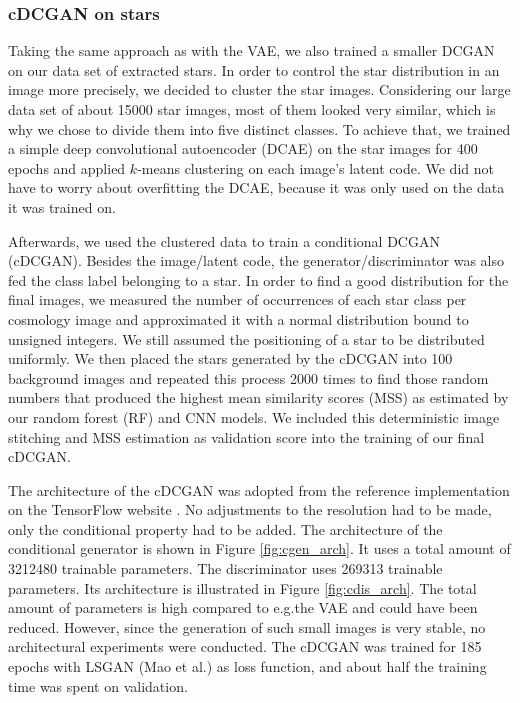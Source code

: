 \documentclass[10pt,conference,compsocconf]{IEEEtran}
\begin{document}
\subsubsection{cDCGAN on stars}
Taking the same approach as with the VAE, we also trained a smaller DCGAN on our data set of extracted stars.
In order to control the star distribution in an image more precisely, we decided to cluster the star images. Considering our large data set of about \SI{15000}{} star images, most of them looked very similar, which is why we chose to divide them into five distinct classes. To achieve that, we trained a simple deep convolutional autoencoder (DCAE) on the star images for 400 epochs and applied $k$-means clustering on each image's latent code. We did not have to worry about overfitting the DCAE, because it was only used on the data it was trained on.

Afterwards, we used the clustered data to train a conditional DCGAN (cDCGAN). Besides the image/latent code, the generator/discriminator was also fed the class label belonging to a star. In order to find a good distribution for the final images, we measured the number of occurrences of each star class per cosmology image and approximated it with a normal distribution bound to unsigned integers. We still assumed the positioning of a star to be distributed uniformly. We then placed the stars generated by the cDCGAN into \SI{100}{} background images and repeated this process \SI{2000}{} times to find those random numbers that produced the highest mean similarity scores (MSS) as estimated by our random forest (RF) and CNN models. We included this deterministic image stitching and MSS estimation as validation score into the training of our final cDCGAN.

The architecture of the cDCGAN was adopted from the reference implementation on the TensorFlow website \cite{dcgantf}. No adjustments to the resolution had to be made, only the conditional property had to be added. The architecture of the conditional generator is shown in Figure \ref{fig:cgen_arch}. It uses a total amount of \SI{3212480}{} trainable parameters. The discriminator uses \SI{269313}{} trainable parameters. Its architecture is illustrated in Figure \ref{fig:cdis_arch}. The total amount of parameters is high compared to e.g.\@ the VAE and could have been reduced. However, since the generation of such small images is very stable, no architectural experiments were conducted. The cDCGAN was trained for 185 epochs with LSGAN (Mao et al.\@ \cite{lsgan}) as loss function, and about half the training time was spent on validation.
\end{document}
